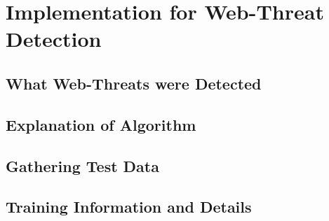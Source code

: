\chapter{Implementation for Web-Threat Detection}

\section{What Web-Threats were Detected}

\section{Explanation of Algorithm}

\section{Gathering Test Data}

\section{Training Information and Details}